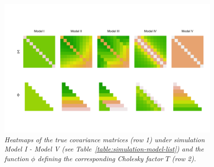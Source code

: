 %
\begin{figure}[H] 
\begin{center}
  \includegraphics[width = \textwidth]{img/chapter-4/cov-cholesky-grid}%
\caption{\textit{Heatmaps of the true covariance matrices (row 1) under simulation Model I - Model V (see Table~\ref{table:simulation-model-list}) and the function $\phi$ defining the corresponding Cholesky factor $T$ (row 2).} } \label{fig:true-covariance-heatmaps}
\end{center}
\end{figure}


\bigskip

%


